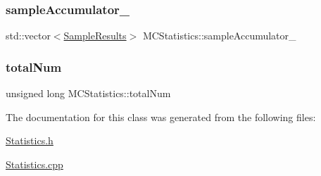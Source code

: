 \subsubsection{\texorpdfstring{sample\+Accumulator\+\_\+}{sampleAccumulator\_}}
{\footnotesize\ttfamily std\+::vector$<$\hyperlink{class_m_c_statistics_1_1_sample_results}{Sample\+Results}$>$ M\+C\+Statistics\+::sample\+Accumulator\+\_\+\hspace{0.3cm}{\ttfamily [private]}}

\hypertarget{class_m_c_statistics_ada9be8c85593b98c76b8b61252db97e2}{}\label{class_m_c_statistics_ada9be8c85593b98c76b8b61252db97e2} 
\subsubsection{\texorpdfstring{total\+Num}{totalNum}}
{\footnotesize\ttfamily unsigned long M\+C\+Statistics\+::total\+Num\hspace{0.3cm}{\ttfamily [private]}}



The documentation for this class was generated from the following files\+:\begin{DoxyCompactItemize}
\item 
\hyperlink{_statistics_8h}{Statistics.\+h}\item 
\hyperlink{_statistics_8cpp}{Statistics.\+cpp}\end{DoxyCompactItemize}
